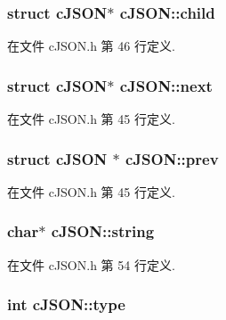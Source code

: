 \subsubsection[{child}]{\setlength{\rightskip}{0pt plus 5cm}struct {\bf c\+J\+S\+O\+N}$\ast$ c\+J\+S\+O\+N\+::child}\label{structc_j_s_o_n_a401b274c2da358dac5c23ab8b2c71f85}


在文件 c\+J\+S\+O\+N.\+h 第 46 行定义.

\hypertarget{structc_j_s_o_n_ade862b880379b5e2a591f7326401fa8d}{}
\subsubsection[{next}]{\setlength{\rightskip}{0pt plus 5cm}struct {\bf c\+J\+S\+O\+N}$\ast$ c\+J\+S\+O\+N\+::next}\label{structc_j_s_o_n_ade862b880379b5e2a591f7326401fa8d}


在文件 c\+J\+S\+O\+N.\+h 第 45 行定义.

\hypertarget{structc_j_s_o_n_ad521633b2c32126f59d962c5673de362}{}
\subsubsection[{prev}]{\setlength{\rightskip}{0pt plus 5cm}struct {\bf c\+J\+S\+O\+N} $\ast$ c\+J\+S\+O\+N\+::prev}\label{structc_j_s_o_n_ad521633b2c32126f59d962c5673de362}


在文件 c\+J\+S\+O\+N.\+h 第 45 行定义.

\hypertarget{structc_j_s_o_n_aa6b47e9a4b0e0a26f519b1a2b6739983}{}
\subsubsection[{string}]{\setlength{\rightskip}{0pt plus 5cm}char$\ast$ c\+J\+S\+O\+N\+::string}\label{structc_j_s_o_n_aa6b47e9a4b0e0a26f519b1a2b6739983}


在文件 c\+J\+S\+O\+N.\+h 第 54 行定义.

\hypertarget{structc_j_s_o_n_ab13084c574681593b12f6e0a3db0dcfc}{}
\subsubsection[{type}]{\setlength{\rightskip}{0pt plus 5cm}int c\+J\+S\+O\+N\+::type}\label{structc_j_s_o_n_ab13084c574681593b12f6e0a3db0dcfc}


